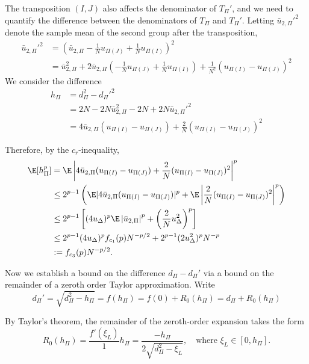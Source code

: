 The transposition $(I, J)$ also affects the denominator of $T_{\Pi}'$, and we need to quantify the
difference between the denominators of $T_{\Pi}$ and $T_{\Pi}'$.  Letting $\bar{u}_{2,\Pi}'^2$
denote the sample mean of the second group after the transposition,
\begin{align*}
  \bar{u}_{2,\Pi}'^2 &= \left ( \bar{u}_{2,\Pi}-\frac{1}{N}u_{\Pi(J)}+\frac{1}{N}u_{\Pi(I)} \right )^2 \\
  &= \bar{u}_{2,\Pi}^2 + 2 \bar{u}_{2,\Pi} \left ( -\frac{1}{N}u_{\Pi(J)} +
      \frac{1}{N}u_{\Pi(I)} \right ) + \frac{1}{N^2}(u_{\Pi(I)} - u_{\Pi(J)})^2
\end{align*}
We consider the difference
\begin{align*}
  h_{\Pi} &= d_{\Pi}^2 - d_{\Pi}'^2 \\
  &= 2N - 2N \bar{u}_{2,\Pi}^2 - 2N + 2N\bar{u}_{2,\Pi}'^2 \\
  &= 4\bar{u}_{2,\Pi}(u_{\Pi(I)} - u_{\Pi(J)}) + \frac{2}{N}(u_{\Pi(I)} - u_{\Pi(J)})^2
\end{align*}

Therefore, by the $c_r$-inequality,
\begin{align}
  \E[h_{\Pi}^p] &= \E \left | 4\bar{u}_{2,\Pi}(u_{\Pi(I)}-u_{\Pi(J)}) +
      \frac{2}{N}(u_{\Pi(I)}-u_{\Pi(J)})^2 \right |^p \nonumber \\
  &\leq 2^{p-1} \left ( \E |4\bar{u}_{2,\Pi}(u_{\Pi(I)}-u_{\Pi(J)})|^p 
    + \E \left |\frac{2}{N}(u_{\Pi(I)}-u_{\Pi(J)})^2 \right |^p \right ) \nonumber \\
  &\leq 2^{p-1}\left [ (4u_{\Delta})^p \E \left | \bar{u}_{2,\Pi} \right |^p
    + \left ( \frac{2}{N}u_{\Delta}^2 \right )^p \right ] \nonumber \\
  &\leq 2^{p-1} (4u_{\Delta})^p f_{c_1}(p)N^{-p/2} +
  2^{p-1}(2u_{\Delta}^2)^pN^{-p} \nonumber \\
  &:= f_{c_3}(p)N^{-p/2} \label{def:hp}.
\end{align}

Now we establish a bound on the difference $d_{\Pi}-d_{\Pi}'$ via a bound on the remainder of a
zeroth order Taylor approximation.  Write
\begin{equation*}
  d_{\Pi}' = \sqrt{d_{\Pi}^2-h_{\Pi}} = f(h_{\Pi}) = f(0) + R_0(h_{\Pi}) = d_{\Pi} + R_0(h_{\Pi})
\end{equation*}

By Taylor's theorem, the remainder of the zeroth-order expansion takes the form 
\begin{equation*}
  R_0(h_{\Pi}) = \frac{f'(\xi_L)}{1}h_{\Pi} = \frac{-h_{\Pi}}{2\sqrt{d_{\Pi}^2-\xi_L}}, \quad
  \text{where } \xi_L \in [0, h_{\Pi}].
\end{equation*}

